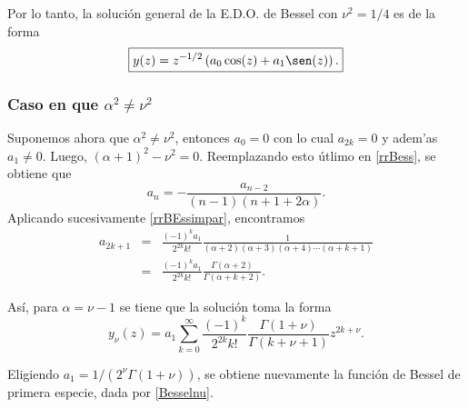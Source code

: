 Por lo tanto, la soluci\'on general de la E.D.O. de Bessel con $\nu^2=1/4$ es de la forma
\begin{equation}
\boxed{y(z)= z^{-1/2}\left(a_0\cos(z)+a_1\sen(z) \right).}
\end{equation}


\subsubsection{Caso en que $\alpha^2\neq\nu^2$}
Suponemos ahora que $\alpha^2\neq\nu^2$, entonces $a_0=0$ con lo cual $a_{2k}= 0$ y adem'as  $a_1\neq 0$. Luego, $(\alpha+1)^2-\nu^2=0$. Reemplazando esto \'utlimo en \eqref{rrBess}, se obtiene que
\begin{equation} \label{rrBEssimpar}
a_n=-\frac{a_{n-2}}{(n-1)(n+1+2\alpha)}.
\end{equation}
Aplicando sucesivamente \eqref{rrBEssimpar}, encontramos
\begin{eqnarray}
a_{2k+1}&=&\frac{(-1)^ka_1}{2^{2k}k!}\frac{1}{(\alpha+2)(\alpha+3)(\alpha+4)\cdots (\alpha +k+1)}\\
&=&\frac{(-1)^ka_1}{2^{2k }k!}\frac{\Gamma(\alpha+2)}{\Gamma(\alpha+k+2)}.
\end{eqnarray}

As\'i, para $\alpha=\nu-1$ se tiene que la soluci\'on toma la forma
\begin{equation}
y_\nu(z) = a_1 \sum_{k=0}^\infty \frac{(-1)^k}{2^{2k}k!}\frac{\Gamma(1+\nu)}{\Gamma(k+\nu+ 1) }
z^{2k+\nu}.
\end{equation}

Eligiendo $a_1=1/(2^{\nu}\Gamma(1+\nu))$, se obtiene nuevamente la funci\'on de Bessel de primera especie, dada por \eqref{Besselnu}.




